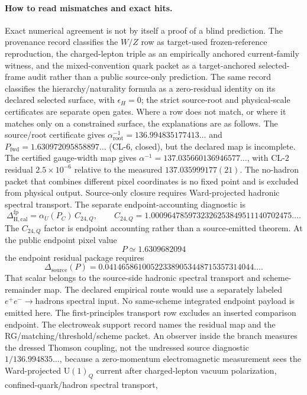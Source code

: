 \documentclass[11pt]{article}
\newcommand{\U}{\mathrm{U}}
\begin{document}
\paragraph{How to read mismatches and exact hits.}
Exact numerical agreement is not by itself a proof of a blind prediction. The provenance
record classifies the \(W/Z\) row as target-used frozen-reference reproduction, the charged-lepton
triple as an empirically anchored current-family witness, and the mixed-convention quark packet as a
target-anchored selected-frame audit rather than a public source-only prediction. The
same record classifies the hierarchy/naturality formula as a zero-residual
identity on its declared selected surface, with \(\epsilon_H=0\); the strict
source-root and physical-scale certificates are separate open gates. Where a
row does not match, or where it matches only on a constrained surface, the explanations are
as follows. The source/root certificate gives
\(\alpha_{\mathrm{root}}^{-1}=136.994835177413\ldots\) and
\(P_{\mathrm{fwd}}=1.630972095858897\ldots\) (CL-6, closed), but the declared map is
incomplete. The certified gauge-width map gives
\(\alpha^{-1}=137.035660136946577\ldots\), with CL-2 residual
\(2.5\times10^{-6}\) relative to the measured \(137.035999177(21)\). The no-hadron packet
that combines different pixel coordinates is no fixed point and is excluded from physical
output. Source-only closure requires Ward-projected hadronic spectral transport. The separate
endpoint-accounting diagnostic is
\[
\Delta^{\mathrm{fp}}_{\mathrm{H,cal}}
=\alpha_U(P_C)\,C_{24,Q},
\qquad
C_{24,Q}
=1.0009647859732326253849511140702475\ldots.
\]
The \(C_{24,Q}\) factor is endpoint accounting rather than a source-emitted theorem. At the public endpoint pixel value
\[
P\simeq1.6309682094
\]
the endpoint residual package requires
\[
\Delta_{\mathrm{source}}(P)=0.041465861005223389053448715357314044\ldots.
\]
That scalar belongs to the source-side hadronic spectral transport and
scheme-remainder map. The declared empirical route would use a separately labeled
\(e^+e^-\to\mathrm{hadrons}\) spectral input. No same-scheme integrated endpoint payload is emitted
here. The first-principles transport row excludes an inserted comparison endpoint. The
electroweak support record names the residual map and the
RG/matching/threshold/scheme packet.
An observer inside the branch measures the dressed Thomson coupling, not the
undressed source diagnostic \(1/136.994835\ldots\), because a zero-momentum
electromagnetic measurement sees the Ward-projected \(\U(1)_Q\) current after
charged-lepton vacuum polarization, confined-quark/hadron spectral transport,
\end{document}
